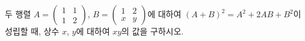 \hspace*{2mm}\begin{minipage}[t]{\dimexpr\linewidth-2mm\relax}\vspace{0pt}
두 행렬 $A=\begin{pmatrix} 1 & 1 \\ 1 & 2 \end{pmatrix}$, $B=\begin{pmatrix} 1 & 2 \\ x & y \end{pmatrix}$에 대하여 $(A+B)^2=A^2+2AB+B^2$이 성립할 때, 상수 $x$, $y$에 대하여 $xy$의 값을 구하시오.\end{minipage}
